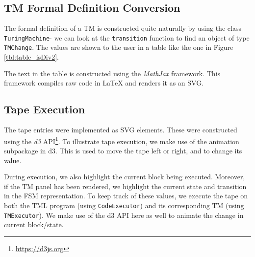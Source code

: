 \subsection{TM Formal Definition Conversion}
The formal definition of a TM is constructed quite naturally by using the class \texttt{TuringMachine}- we can look at the \texttt{transition} function to find an object of type \texttt{TMChange}. The values are shown to the user in a table like the one in Figure \ref{tbl:table_isDiv2}.

The text in the table is constructed using the \emph{MathJax} framework. This framework compiles raw code in LaTeX and renders it as an SVG.

\subsection{Tape Execution}

The tape entries were implemented as SVG elements. These were constructed using the \emph{d3} API\footnote{\url{https://d3js.org}}. To illustrate tape execution, we make use of the animation subpackage in d3. This is used to move the tape left or right, and to change its value. 

During execution, we also highlight the current block being executed. Moreover, if the TM panel has been rendered, we highlight the current state and transition in the FSM representation. To keep track of these values, we execute the tape on both the TML program (using \texttt{CodeExecutor}) and its corresponding TM (using \texttt{TMExecutor}). We make use of the d3 API here as well to animate the change in current block/state.
